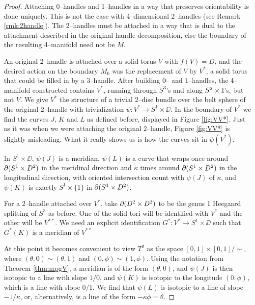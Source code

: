 \begin{proof}
	Attaching 0--handles and 1--handles in a way that preserves orientability is done uniquely.
	This is not the case with 4--dimensional 2--handles (see Remark \ref{rmk:2handle}).
	The 2--handles must be attached in a way that is dual to the attachment described in the original handle decomposition, else the boundary of the resulting 4--manifold need not be $M$.
	
	An original 2--handle is attached over a solid torus $V$ with $f(V)=D$, and the desired action on the boundary $M_0$ was the replacement of $V$ by $V^*$, a solid torus that could be filled in by a 3--handle.
	After building 0-- and 1--handles, the 4--manifold constructed contains $V^*$, running through $S^3$'s and along $S^2\times\mathbb{I}$'s, but not $V$.
	We give $V^*$ the structure of a trivial 2--disc bundle over the belt sphere of the original 2--handle with trivialization $\psi:V^*\to S^1\times\DD$.
	In the boundary of $V^*$ we find the curves $J$, $K$ and $L$ as defined before, displayed in Figure \ref{fig:VV*}.
	Just as it was when we were attaching the original 2--handle, Figure \ref{fig:VV*} is slightly misleading.
	What it really shows us is how the curves sit in $\psi(V^*)$.
	
	In $S^1\times\DD$, $\psi(J)$ is a meridian, $\psi(L)$ is a curve that wraps once around $\partial(S^1\times D^2)$ in the meridinal direction and $\kappa$ times around $\partial(S^1\times D^2)$ in the longitudinal direction, with oriented intersection count with $\psi(J)$ of $\kappa$, and $\psi(K)$ is exactly $S^1\times\{1\}$ in $\partial(S^1\times D^2)$.
	
	For a 2--handle attached over $V^*$, take $\partial (D^2\times D^2)$ to be the genus 1 Heegaard splitting of $S^3$ as before.
	One of the solid tori will be identified with $V^*$ and the other will be $V^{**}$.
	We need an explicit identification $G^*:V^*\to S^1\times\DD$ such that $G^*(K)$ is a meridian of $V^{**}$
	
	At this point it becomes convenient to view $T^2$ as the space $[0,1]\times[0,1]/\sim$, where $(\theta,0)\sim(\theta,1)$ and $(0,\phi)\sim(1,\phi)$.
	Using the notation from Theorem \ref{thm:mpgV}, a meridian is of the form $(\theta,0)$, and $\psi(J)$ is then isotopic to a line with slope $1/0$, and $\psi(K)$ is isotopic to the longitude $(0,\phi)$, which is a line with slope $0/1$.
	We find that $\psi(L)$ is isotopic to a line of slope $-1/\kappa$, or, alternatively, is a line of the form $-\kappa\phi=\theta$.
	
	
\end{proof}

